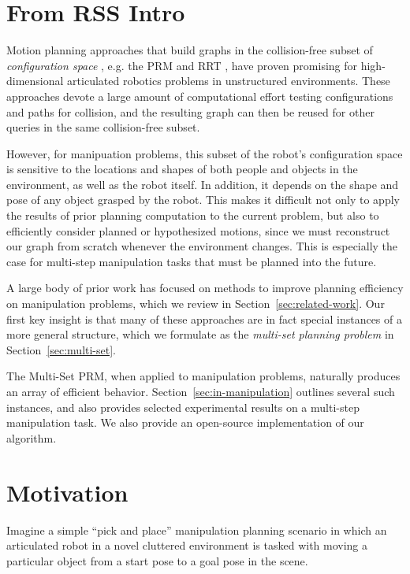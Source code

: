 \section{From RSS Intro}

Motion planning approaches that build graphs
in the collision-free subset of
\emph{configuration space} \cite{lozanoperez1983cspace},
e.g. the
PRM \cite{kavrakietal1996prm}
and RRT \cite{lavallekuffner1999rrt},
have proven promising
for high-dimensional articulated robotics problems
in unstructured environments.
These approaches devote a large amount of computational effort
testing configurations and paths for collision,
and the resulting graph can then be reused
for other queries in the same collision-free subset.

However,
for manipuation problems,
this subset of the robot's configuration space
is sensitive to the locations and shapes of
both people and objects in the environment,
as well as the robot itself.
In addition, it depends on the shape and pose of any object
grasped by the robot.
This makes it difficult not only to apply the results of prior
planning computation to the current problem,
but also to efficiently consider planned or hypothesized motions,
since we must reconstruct our graph from scratch whenever
the environment changes.
This is especially the case for
multi-step manipulation tasks that must be planned into the future.

A large body of prior work has focused on methods to
improve planning efficiency on manipulation problems,
which we review in Section~\ref{sec:related-work}.
Our first key insight is that many of these approaches are
in fact special instances of a more general structure,
which we formulate as the \emph{multi-set planning problem}
in Section~\ref{sec:multi-set}.

The Multi-Set PRM,
when applied to manipulation problems,
naturally produces an array of efficient behavior.
Section~\ref{sec:in-manipulation} outlines several such instances,
and also provides selected experimental results
on a multi-step manipulation task.
We also provide an open-source implementation of our algorithm.

\section{Motivation}

Imagine a simple ``pick and place'' manipulation planning scenario
in which an articulated robot in a novel cluttered environment
is tasked with moving a particular object from a start pose to a goal
pose in the scene.

